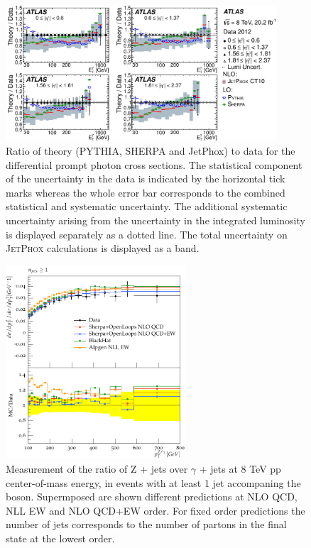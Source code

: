 \documentclass{PoS}
\providecommand{\JETPHOX} {{\textsc{JetPhox}}\xspace}
\begin{document}
\begin{figure}
\begin{center}
\includegraphics[width=0.9\textwidth]{Figure12.pdf} 
\caption{Ratio of theory (PYTHIA, SHERPA and JetPhox) to data for the differential prompt photon cross sections. The
  statistical component of the uncertainty in the data is indicated by the horizontal 
  tick marks whereas the whole error bar corresponds to the combined statistical and systematic uncertainty. The
  additional systematic uncertainty arising from the uncertainty in the integrated luminosity is displayed separately as
  a dotted line. The total uncertainty on \JETPHOX calculations is displayed as a band. }  
\label{fig:photon_MC}
\end{center}
\end{figure}



\begin{figure}
\begin{center}
\includegraphics[width=0.6\textwidth]{Figure14.pdf} 
 \caption{Measurement of the ratio of Z + jets over $\gamma$ + jets at 8 TeV pp
   center-of-mass energy, in events with at least 1 jet accompaning the
   boson. Supermposed are shown different predictions at NLO QCD, NLL EW and NLO QCD+EW order. 
   For fixed order predictions the number of jets corresponds to the
   number of partons in the final state at the lowest order.} 
\label{zgrNLO}
\end{center}
\end{figure}
\end{document}

